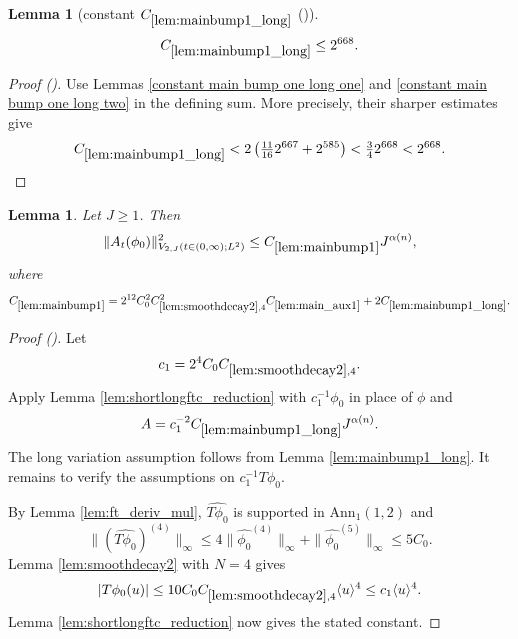 \documentclass[12pt,reqno]{amsart}
\newcommand{\auto}{{({\tiny\faCar})}}
\theoremstyle{plain}
\newtheorem{lemma}[theorem]{Lemma}
\numberwithin{equation}{section}
\theoremstyle{remark}
\newcommand{\using}[1]{}
\begin{document}
\begin{lemma}[constant $C_{\ref{lem:mainbump1_long}}$ \auto]\label{constant main bump one long}\using{constant main bump one long one}\using{constant main bump one long two}\using{lem:mainbump1_long}
\begin{equation}\label{constant main bump one long bound}
C_{\ref{lem:mainbump1_long}}\le2^{668}.
\end{equation}
\end{lemma}
\begin{proof}[Proof \auto]
Use Lemmas \ref{constant main bump one long one} and \ref{constant main bump one long two} in the defining sum. More precisely, their sharper estimates give
\[
C_{\ref{lem:mainbump1_long}}
<2\left(\tfrac{11}{16}2^{667}+2^{585}\right)
<\tfrac34 2^{668}<2^{668}.
\]
\end{proof}


\begin{lemma}\label{lem:mainbump1}\using{lem:smoothdecay2}\using{lem:shortlongftc_reduction}\using{lem:mainbump1_long}\using{lem:ft_deriv_mul}
Let $J\ge1$. Then
\begin{equation}\label{mainbump1}
\|A_t(\phi_0)\|_{V_{2,J}(t\in(0,\infty);L^2)}^2
\le C_{\ref{lem:mainbump1}}J^{\alpha(n)},
\end{equation}
where
\begin{equation}\label{auto:main-bump-one-constant-definition}
C_{\ref{lem:mainbump1}}
=2^{12}C_0^2C_{\ref{lem:smoothdecay2},4}^2C_{\ref{lem:main_aux1}}
+2C_{\ref{lem:mainbump1_long}}.
\end{equation}
\end{lemma}

\begin{proof}[Proof \auto]
Let
\[
c_1=2^4C_0C_{\ref{lem:smoothdecay2},4}.
\]
Apply Lemma \ref{lem:shortlongftc_reduction} with $c_1^{-1}\phi_0$ in place of $\phi$ and
\[
A=c_1^{-2}C_{\ref{lem:mainbump1_long}}J^{\alpha(n)}.
\]
The long variation assumption follows from Lemma \ref{lem:mainbump1_long}. It remains to verify the assumptions on $c_1^{-1}T\phi_0$.

By Lemma \ref{lem:ft_deriv_mul}, $\widehat{T\phi_0}$ is supported in $\mathrm{Ann}_1(1,2)$ and
\[
\|(\widehat{T\phi_0})^{(4)}\|_\infty
\le4\|\widehat{\phi_0}^{(4)}\|_\infty
+\|\widehat{\phi_0}^{(5)}\|_\infty
\le5C_0.
\]
Lemma \ref{lem:smoothdecay2} with $N=4$ gives
\[
|T\phi_0(u)|
\le10C_0C_{\ref{lem:smoothdecay2},4}\langle u\rangle^4
\le c_1\langle u\rangle^4.
\]
Lemma \ref{lem:shortlongftc_reduction} now gives the stated constant.
\end{proof}
\end{document}
